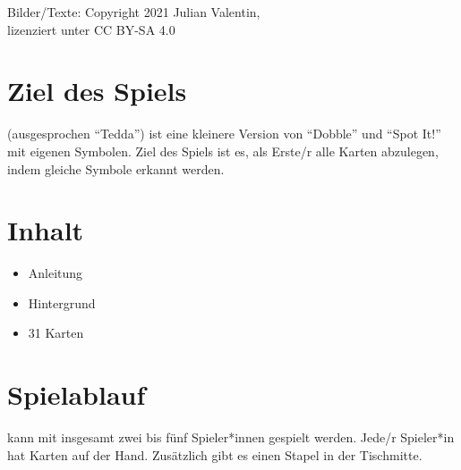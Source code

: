 \documentclass[paper=81mm:81mm]{scrartcl}
\begin{document}
\vspace*{\fill}

\noindent\hspace*{9mm}%

\vspace*{\fill}

{%
  \noindent\small%
  Bilder/Texte: Copyright \textcopyright{} 2021 Julian Valentin,\\
  lizenziert unter \doclicenseIcon{} CC BY-SA 4.0%
}

\pagebreak

\section*{Ziel des Spiels}

\theda{} (ausgesprochen "`Tedda"')
ist eine kleinere Version von "`Dobble"' und "`Spot It!"' mit eigenen Symbolen.
Ziel des Spiels ist es, als Erste/r alle Karten abzulegen,
indem gleiche Symbole erkannt werden.

\section*{Inhalt}

\begin{itemize}
  \item
  Anleitung

  \item
  Hintergrund

  \item
  31 Karten
\end{itemize}

\section*{Spielablauf}

\theda{} kann mit insgesamt zwei bis fünf Spieler*innen gespielt werden.
Jede/r Spieler*in hat Karten auf der Hand.
Zusätzlich gibt es einen Stapel in der Tischmitte.
\end{document}
